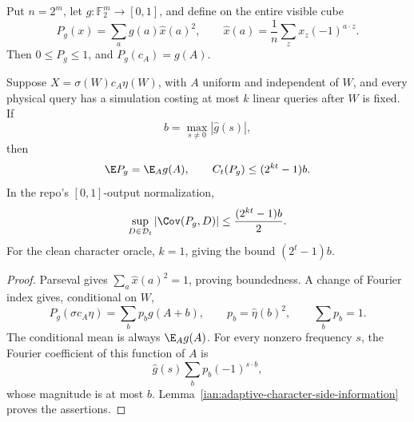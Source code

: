 \begin{corollary}\label{ian:adaptive-character-spectral-targets}
Put \(n=2^m\), let \(g:\mathbb F_2^m\to[0,1]\), and define on the entire visible cube
\[
 P_g(x)=\sum_a g(a)\widehat x(a)^2,
 \qquad
 \widehat x(a)=\frac1n\sum_zx_z(-1)^{a\cdot z}.
\]
Then \(0\le P_g\le1\), and \(P_g(c_A)=g(A)\).

Suppose \(X=\sigma(W)c_A\eta(W)\), with \(A\) uniform and independent of \(W\), and every physical query has a simulation costing at most \(k\) linear queries after \(W\) is fixed. If
\[
 b=\max_{s\ne0}|\widehat g(s)|,
\]
then
\[
 \E P_g=\E_A g(A),\qquad
 C_t(P_g)\le(2^{kt}-1)b.
\]
In the repo's \([0,1]\)-output normalization,
\[
 \sup_{D\in\mathcal D_t}|\Cov(P_g,D)|
 \le\frac{(2^{kt}-1)b}{2}.
\]
For the clean character oracle, \(k=1\), giving the bound
\((2^t-1)b\).
\end{corollary}
\begin{proof}
Parseval gives \(\sum_a\widehat x(a)^2=1\), proving boundedness. A change of Fourier index gives, conditional on \(W\),
\[
 P_g(\sigma c_A\eta)=\sum_b p_b g(A+b),
 \qquad
 p_b=\widehat\eta(b)^2,\qquad
 \sum_b p_b=1.
\]
The conditional mean is always \(\E_A g(A)\). For every nonzero frequency \(s\), the Fourier coefficient of this function of \(A\) is
\[
 \widehat g(s)\sum_b p_b(-1)^{s\cdot b},
\]
whose magnitude is at most \(b\). Lemma~\ref{ian:adaptive-character-side-information} proves the assertions.
\end{proof}

